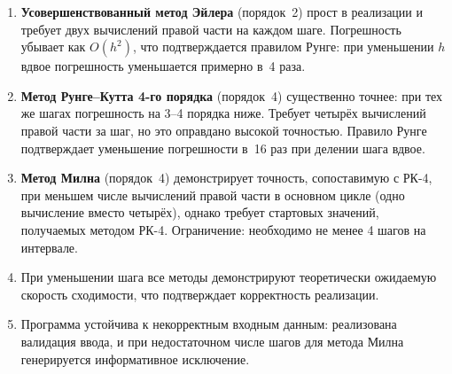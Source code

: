 \documentclass[a4paper,12pt]{article}
\begin{document}
\begin{enumerate}
    \item \textbf{Усовершенствованный метод Эйлера} (порядок~2) прост в реализации и
    требует двух вычислений правой части на каждом шаге. Погрешность убывает как $O(h^2)$,
    что подтверждается правилом Рунге: при уменьшении $h$ вдвое погрешность
    уменьшается примерно в~4 раза.

    \item \textbf{Метод Рунге--Кутта 4-го порядка} (порядок~4) существенно точнее:
    при тех же шагах погрешность на 3--4 порядка ниже. Требует четырёх вычислений
    правой части за шаг, но это оправдано высокой точностью. Правило Рунге
    подтверждает уменьшение погрешности в~16 раз при делении шага вдвое.

    \item \textbf{Метод Милна} (порядок~4) демонстрирует точность, сопоставимую с
    РК-4, при меньшем числе вычислений правой части в основном цикле
    (одно вычисление вместо четырёх), однако требует стартовых значений,
    получаемых методом РК-4. Ограничение: необходимо не менее 4 шагов на интервале.

    \item При уменьшении шага все методы демонстрируют теоретически
    ожидаемую скорость сходимости, что подтверждает корректность реализации.

    \item Программа устойчива к некорректным входным данным: реализована
    валидация ввода, и при недостаточном числе шагов для метода Милна
    генерируется информативное исключение.
\end{enumerate}
\end{document}

